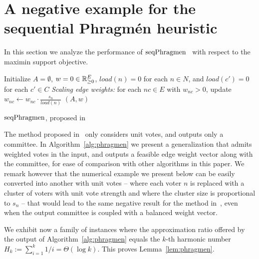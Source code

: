 \section{A negative example for the sequential Phragm\'{e}n heuristic}\label{s:phragmen}

In this section we analyze the performance of $\operatorname{seqPhragmen}$~\cite{brill2017phragmen} with respect to the maximin support objective. 

\begin{algorithm}[htb]
\SetAlgoLined
{}
Initialize $A=\emptyset$, $w=0\in \mathbb{R}_{\geq 0}^E$, $load(n)=0$ for each $n\in N$, and $load(c')=0$ for each $c'\in C$\;
\emph{Scaling edge weights:} for each $nc\in E$ with $w_{nc}>0$, update $w_{nc}\leftarrow w_{nc}\cdot \frac{s_n}{load(n)}$\; 
\Return $(A,w)$\;
\caption{$\operatorname{seqPhragmen}$, proposed in~\cite{brill2017phragmen}}
\label{alg:phragmen}
\end{algorithm}

The method proposed in~\cite{brill2017phragmen} only considers unit votes, and outputs only a committee. 
In Algorithm~\ref{alg:phragmen} we present a generalization that admits weighted votes in the input, and outputs a feasible edge weight vector along with the committee, for ease of comparison with other algorithms in this paper. 
We remark however that the numerical example we present below can be easily converted into another with unit votes -- where each voter $n$ is replaced with a cluster of voters with unit vote strength and where the cluster size is proportional to $s_n$ -- that would lead to the same negative result for the method in~\cite{brill2017phragmen}, even when the output committee is coupled with a balanced weight vector.

We exhibit now a family of instances where the approximation ratio offered by the output of Algorithm~\ref{alg:phragmen} equals the $k$-th harmonic number $H_k:=\sum_{i=1}^k 1/i = \Theta(\log k)$. This proves Lemma~\ref{lem:phragmen}.

